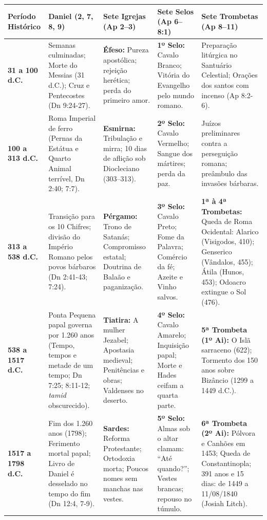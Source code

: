 \documentclass[11pt,a4paper,openany]{book}
\begin{document}
\begin{table}[htbp]
\centering
\footnotesize
\setlength{\tabcolsep}{5pt}
\renewcommand{\arraystretch}{1.25}
\begin{tabularx}{\textwidth}{>{\raggedright\arraybackslash}p{} >{\raggedright\arraybackslash}X >{\raggedright\arraybackslash}X >{\raggedright\arraybackslash}X >{\raggedright\arraybackslash}X}
\toprule
\textbf{Período Histórico} & \textbf{Daniel (2, 7, 8, 9)} & \textbf{Sete Igrejas (Ap 2–3)} & \textbf{Sete Selos (Ap 6–8:1)} & \textbf{Sete Trombetas (Ap 8–11)} \\
\midrule
\textbf{31 a 100 d.C.} & 70 Semanas culminadas; Morte do Messias (31 d.C.); Cruz e Pentecostes (Dn 9:24-27). & \textbf{Éfeso:} Pureza apostólica; rejeição herética; perda do primeiro amor. & \textbf{1º Selo:} Cavalo Branco; Vitória do Evangelho pelo mundo romano. & Preparação litúrgica no Santuário Celestial; Orações dos santos com incenso (Ap 8:2-6). \\
\addlinespace[3pt]
\textbf{100 a 313 d.C.} & Roma Imperial de ferro (Pernas da Estátua e Quarto Animal terrível, Dn 2:40; 7:7). & \textbf{Esmirna:} Tribulação e mirra; 10 dias de aflição sob Diocleciano (303–313). & \textbf{2º Selo:} Cavalo Vermelho; Sangue dos mártires; perda da paz. & Juízos preliminares contra a perseguição romana; preâmbulo das invasões bárbaras. \\
\addlinespace[3pt]
\textbf{313 a 538 d.C.} & Transição para os 10 Chifres; divisão do Império Romano pelos povos bárbaros (Dn 2:41-43; 7:24). & \textbf{Pérgamo:} Trono de Satanás; Compromisso estatal; Doutrina de Balaão e paganização. & \textbf{3º Selo:} Cavalo Preto; Fome da Palavra; Comércio da fé; Azeite e Vinho salvos. & \textbf{1ª à 4ª Trombetas:} Queda de Roma Ocidental: Alarico (Visigodos, 410); Genserico (Vândalos, 455); Átila (Hunos, 453); Odoacro extingue o Sol (476). \\
\addlinespace[3pt]
\textbf{538 a 1517 d.C.} & Ponta Pequena papal governa por 1.260 anos (Tempo, tempos e metade de um tempo; Dn 7:25; 8:11-12; \textit{tamid} obscurecido). & \textbf{Tiatira:} A mulher Jezabel; Apostasia medieval; Penitências e obras; Valdenses no deserto. & \textbf{4º Selo:} Cavalo Amarelo; Inquisição papal; Morte e Hades ceifam a quarta parte. & \textbf{5ª Trombeta (1º Ai):} O Islã sarraceno (622); Tormento dos 150 anos sobre Bizâncio (1299 a 1449 d.C.). \\
\addlinespace[3pt]
\textbf{1517 a 1798 d.C.} & Fim dos 1.260 anos (1798); Ferimento mortal papal; Livro de Daniel é desselado no tempo do fim (Dn 12:4, 7-9). & \textbf{Sardes:} Reforma Protestante; Ortodoxia morta; Poucos nomes sem manchas nas vestes. & \textbf{5º Selo:} Almas sob o altar clamam: ``Até quando?''; Vestes brancas; repouso no túmulo. & \textbf{6ª Trombeta (2º Ai):} Pólvora e Canhões em 1453; Queda de Constantinopla; 391 anos e 15 dias: de 1449 a 11/08/1840 (Josiah Litch). \\

\end{tabularx}
\end{table}
\end{document}
